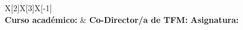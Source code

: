 {\begin{center}
\begin{covertbl}{X[2]X[3]X[-1]}
          \\

        \textbf{Curso académico:} \curso    &
            \def\temp{}\ifx\temp\codirige   \else
                \textbf{Co-Director/a de TFM:} \linebreak \hspace*{30pt} \codirige
            \fi
            \def\temp{}\ifx\temp\asignatura   \else
                \textbf{Asignatura:} \asignatura
            \fi
          \\
    \end{covertbl}
\end{center}



\vspace{2cm}

\restoregeometry
\clearpage
\pagecolor{white}

} %